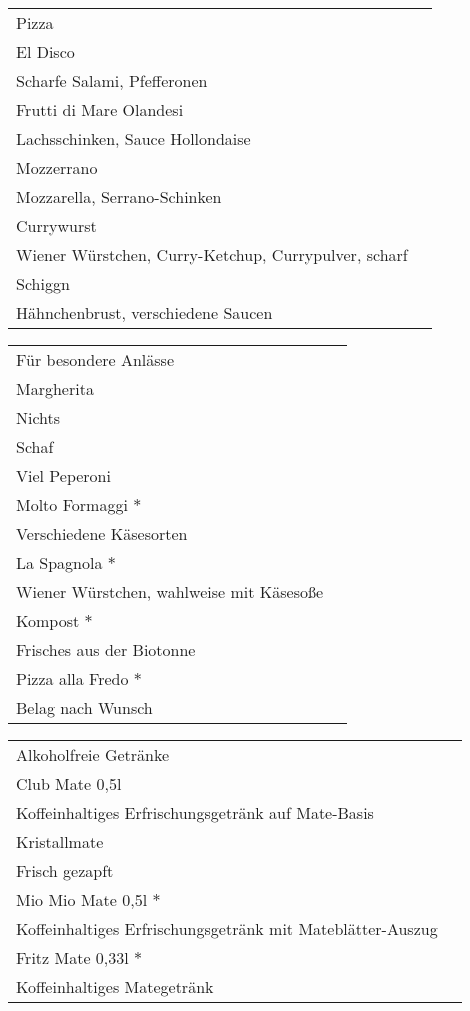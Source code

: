 \documentclass[12pt]{article}
\makeatletter
\newcommand*\ColText[1]{\textcolor{Goldenrod3}{#1}}
\newenvironment{Group}[1]
  {\noindent\begin{tabular*}{\textwidth}{@{}p{\linewidth}@{\extracolsep{\fill}}r@{}}
    {\fontsize{24}{29}\selectfont\ColText{#1}}\\[0.8em]}
  {\end{tabular*}}
\newcommand*\Entry[2]{%
  \sffamily#1 & #2}
\newcommand*\Expl[1]{%
  \hspace*{1em}\footnotesize #1\vspace*{5pt}}
\makeatother
\begin{document}
\vspace{1em}

\begin{Group}{Pizza}
\Entry{El Disco}{} \\
\Expl{Scharfe Salami, Pfefferonen} \\
\Entry{Frutti di Mare Olandesi}{} \\
\Expl{Lachsschinken, Sauce Hollondaise} \\
\Entry{Mozzerrano}{} \\
\Expl{Mozzarella, Serrano-Schinken} \\
\Entry{Currywurst} \\
\Expl{Wiener Würstchen, Curry-Ketchup, Currypulver, scharf} \\
\Entry{Schiggn}{} \\
\Expl{Hähnchenbrust, verschiedene Saucen} \\
\end{Group}

\vspace{1em}

\begin{Group}{Für besondere Anlässe}
\Entry{Margherita}{} \\ 
\Expl{Nichts} \\
\Entry{Schaf}{} \\ 
\Expl{Viel Peperoni} \\
\Entry{Molto Formaggi $\ast$}{} \\ 
\Expl{Verschiedene Käsesorten} \\
\Entry{La Spagnola $\ast$}{} \\
\Expl{Wiener Würstchen, wahlweise mit Käsesoße} \\
\Entry{Kompost $\ast$}{} \\ 
\Expl{Frisches aus der Biotonne} \\
\Entry{Pizza alla Fredo $\ast$}{} \\
\Expl{Belag nach Wunsch} \\
\end{Group}


\vspace{1em}

\begin{Group}{Alkoholfreie Getränke}
\Entry{Club Mate 0,5l}{} \\
\Expl{Koffeinhaltiges Erfrischungsgetränk auf Mate-Basis} \\
\Entry{Kristallmate}{} \\
\Expl{Frisch gezapft} \\
\Entry{Mio Mio Mate 0,5l $\ast$}{} \\
\Expl{Koffeinhaltiges Erfrischungsgetränk mit Mateblätter-Auszug} \\
\Entry{Fritz Mate 0,33l $\ast$}{} \\
\Expl{Koffeinhaltiges Mategetränk} \\
\end{Group}
\end{document}
